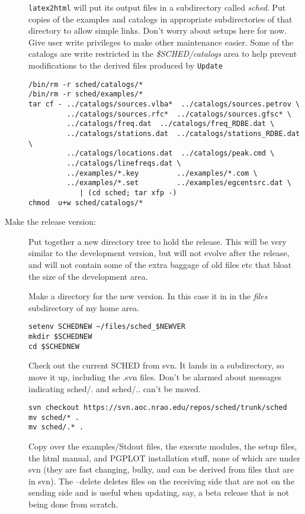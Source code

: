 \documentclass{report}
\begin{document}
\begin{description}
{\tt latex2html} will put its output files in a subdirectory called
{\sl sched}.  Put copies of the examples and catalogs in appropriate
subdirectories of that directory to allow simple links.  Don't worry
about setups here for now.  Give user write privileges to make other
maintenance easier.  Some of the catalogs are write restricted in the
{\sl \$SCHED/catalogs} area to help prevent modifications to the
derived files produced by {\tt Update}

\begin{verbatim}
/bin/rm -r sched/catalogs/*
/bin/rm -r sched/examples/*
tar cf - ../catalogs/sources.vlba*  ../catalogs/sources.petrov \
         ../catalogs/sources.rfc*  ../catalogs/sources.gfsc* \
         ../catalogs/freq.dat  ../catalogs/freq_RDBE.dat \
         ../catalogs/stations.dat  ../catalogs/stations_RDBE.dat \
         ../catalogs/locations.dat  ../catalogs/peak.cmd \
         ../catalogs/linefreqs.dat \
         ../examples/*.key         ../examples/*.com \
         ../examples/*.set         ../examples/egcentsrc.dat \
            | (cd sched; tar xfp -)
chmod  u+w sched/catalogs/*
\end{verbatim}


\item [Make the release version:]

Put together a new directory tree to hold the release.  This will be
very similar to the development version, but will not evolve after the
release, and will not contain some of the extra baggage of old files
etc that bloat the size of the development area.

Make a directory for the new version.  In this case it in in the 
{\sl files} subdirectory of my home area.

\begin{verbatim}
setenv SCHEDNEW ~/files/sched_$NEWVER
mkdir $SCHEDNEW
cd $SCHEDNEW
\end{verbatim}

Check out the current SCHED from svn.  It lands in a subdirectory, so
move it up, including the .svn files.  Don't be alarmed about messages
indicating sched/. and sched/.. can't be moved.

\begin{verbatim}
svn checkout https://svn.aoc.nrao.edu/repos/sched/trunk/sched
mv sched/* .
mv sched/.* .
\end{verbatim}

Copy over the examples/Stdout files, the execute modules, the setup
files, the html manual, and PGPLOT installation stuff, none of which
are under svn (they are fast changing, bulky, and can be derived from
files that are in svn).  The --delete deletes files on the receiving
side that are not on the sending side and is useful when updating,
say, a beta release that is not being done from scratch.


\end{description}
\end{document}
